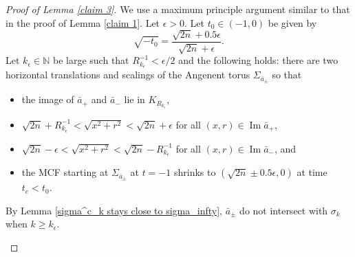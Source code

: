 \documentclass[10pt,a4paper]{amsart}
\begin{document}
		\begin{proof} [Proof of Lemma \ref{claim 3}] We use a maximum principle argument similar to that in the proof of Lemma \ref{claim 1}. Let $\epsilon>0$. Let $t_0 \in (-1, 0)$ be given by 
			\begin{equation} \label{eqn choice of t_0}
				\sqrt{-t_0} = \frac{\sqrt{2n} + 0.5\epsilon}{\sqrt{2n}+\epsilon}.
			\end{equation}
			Let $k_\epsilon \in \mathbb N$ be large such that $R_{k_\epsilon}^{-1}<\epsilon/2$ and the following holds: there are two horizontal translations and scalings of the Angenent torus $\Sigma_{\bar a_\pm}$ so that
			
			\begin{itemize}
				\item the image of $\bar a_+$ and $\bar a_-$ lie in $K_{R_{k_\epsilon}}$, 
				\item $\sqrt{2n}+R_{k_\epsilon}^{-1}< \sqrt{x^2+r^2} <\sqrt{2n}+\epsilon$ for all $(x, r) \in \operatorname{Im} \bar a_+$, 
				\item $\sqrt{2n}-\epsilon <\sqrt{x^2+r^2}<\sqrt{2n}-R_{k_\epsilon}^{-1}$ for all $(x, r) \in \operatorname{Im} \bar a_-$, and
				\item the MCF starting at $\Sigma_{\bar a_\pm}$ at $t=-1$ shrinks to $(\sqrt{2n} \pm 0.5\epsilon, 0)$ at time $t_e <t_0$. 
			\end{itemize}
			By Lemma \ref{sigma^c_k stays close to sigma_infty}, $\bar a_{\pm}$ do not intersect with $\sigma_k$ when $k\ge k_\epsilon$.
			\begin{figure}[ht]
				
				\begin{tikzpicture}[x=0.75pt,y=0.75pt,yscale=-1,xscale=1]
					

\end{tikzpicture}
\end{figure}
\end{proof}
\end{document}
